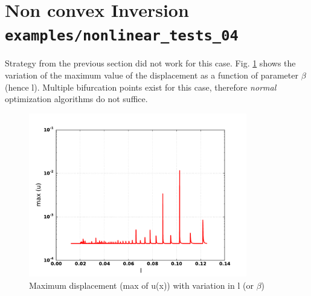 \documentclass[%
notitlepage,
]{revtex4-1}
\newcommand{\be}{\ensuremath{{\beta}}\xspace}
\begin{document}
\section{Non convex Inversion \texttt{examples/nonlinear\_tests\_04}}
Strategy from the previous section did not work for this case. Fig. \ref{fig:nonconvex:inverse} shows the variation of the maximum value of the displacement as a function of parameter \be (hence l). Multiple bifurcation points exist for this case, therefore \textit{normal} optimization algorithms do not suffice.
\begin{figure}[!h]
	\includegraphics[width=0.85\textwidth]{figures/nonlinear_tests_04/max_u.pdf}
    \caption{Maximum displacement (max of u(x)) with variation in l (or \be)}
    \label{fig:nonconvex:inverse}
\end{figure}
\clearpage
\appendix
\end{document}
